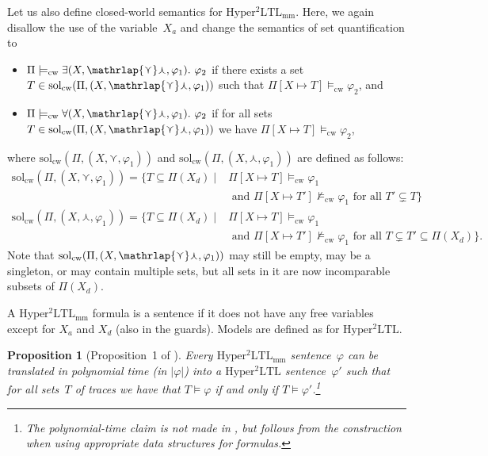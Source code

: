 \documentclass[dvipsnames,10pt,a4paper]{amsart}
\newtheorem{prop}[thm]{Proposition}
\theoremstyle{definition}
\theoremstyle{remark}
\renewcommand{\phi}{\varphi}
\newcommand{\size}[1]{|#1|}
\newcommand{\set}[1]{\{#1\}}
\newcommand{\sohyltl}{\mathrm{Hyper^2LTL}\xspace}
\newcommand{\sohyltlfp}{\mathrm{Hyper^2LTL_{\mathrm{mm}}}\xspace}
\newcommand{\univar}{X_a}
\newcommand{\unidisvar}{X_d}
\newcommand{\smallest}{\curlyvee}
\newcommand{\largest}{\curlywedge}
\newcommand{\smalar}{{\mathrlap{\curlyvee}\curlywedge}}
\newcommand{\solutions}{\mathrm{sol}}
\newcommand{\cw}{\mathrm{cw}}
\begin{document}
Let us also define closed-world semantics for $\sohyltlfp$. Here, we again disallow the use of the variable~$\univar$ and change the semantics of set quantification to 
\begin{itemize}
    \item $\Pi \models_\cw \exists (X,\smalar,\phi_1).\ \phi_2$ if there exists a set~$T \in \solutions_\cw(\Pi, (X,\smalar,\phi_1))$ such that $\Pi[X\mapsto T] \models_\cw \phi_2$, and 
    \item $\Pi \models_\cw \forall (X,\smalar,\phi_1).\ \phi_2$ if for all sets~$T \in \solutions_\cw(\Pi, (X,\smalar,\phi_1))$ we have $\Pi[X\mapsto T] \models_\cw \phi_2$,
\end{itemize}
where $\solutions_\cw(\Pi, (X,\smallest,\phi_1))$ and $\solutions_\cw(\Pi, (X,\largest,\phi_1))$ are  defined as follows:
\begin{align*}
    \solutions_\cw(\Pi, (X,\smallest,\phi_1))  = \set{T \subseteq \Pi(\unidisvar) \mid{}&{} \Pi[X\mapsto T] \models_\cw \phi_1\\ 
    {}&{}\text{ and } \Pi[X\mapsto T'] \not\models_\cw \phi_1\text{ for all }T' \subsetneq T} \\
     \solutions_\cw(\Pi, (X,\largest,\phi_1))= \set{T \subseteq \Pi(\unidisvar) \mid{}&{}  \Pi[X\mapsto T] \models_\cw \phi_1\\ 
    {}&{}\text{ and }  \Pi[X\mapsto T'] \not\models_\cw \phi_1 \text{ for all } T \subsetneq   T' \subseteq\Pi(\unidisvar)  }.
\end{align*}
Note that $\solutions_\cw(\Pi, (X,\smalar,\phi_1))$ may still be empty, may be a singleton, or may contain multiple sets, but all sets in it are now incomparable subsets of $\Pi(\unidisvar)$.

A $\sohyltlfp$ formula is a sentence if it does not have any free variables except for $\univar$ and $ \unidisvar$ (also in the guards). 
Models are defined as for $\sohyltl$.

\begin{prop}[Proposition~1 of \cite{DBLP:conf/cav/BeutnerFFM23}]
\label{prop_fp2classical}
Every $\sohyltlfp$ sentence~$\phi$ can be translated in polynomial time (in $\size{\varphi}$) into a $\sohyltl$ sentence~$\phi'$ such that for all sets~$T$ of traces we have that $T \models \phi$  if and only if  $T \models \phi'$.\footnote{The polynomial-time claim is not made in \cite{DBLP:conf/cav/BeutnerFFM23}, but follows from the construction when using appropriate data structures for formulas.} 
\end{prop}
\end{document}
